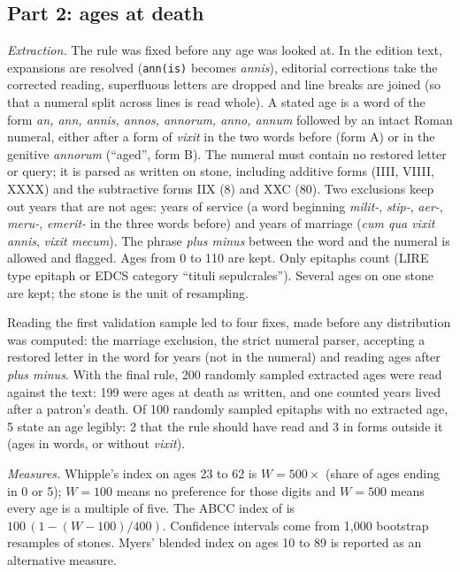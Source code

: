 \documentclass[11pt,a4paper]{article}
\begin{document}
\subsection{Part 2: ages at death}
\textit{Extraction.} The rule was fixed before any age was looked at. In the edition text, expansions are resolved (\texttt{ann(is)} becomes \textit{annis}), editorial corrections take the corrected reading, superfluous letters are dropped and line breaks are joined (so that a numeral split across lines is read whole). A stated age is a word of the form \textit{an, ann, annis, annos, annorum, anno, annum} followed by an intact Roman numeral, either after a form of \textit{vixit} in the two words before (form A) or in the genitive \textit{annorum} (``aged'', form B). The numeral must contain no restored letter or query; it is parsed as written on stone, including additive forms (IIII, VIIII, XXXX) and the subtractive forms IIX (8) and XXC (80). Two exclusions keep out years that are not ages: years of service (a word beginning \textit{milit-}, \textit{stip-}, \textit{aer-}, \textit{meru-}, \textit{emerit-} in the three words before) and years of marriage (\textit{cum qua vixit annis}, \textit{vixit mecum}). The phrase \textit{plus minus} between the word and the numeral is allowed and flagged. Ages from 0 to 110 are kept. Only epitaphs count (LIRE type epitaph or EDCS category ``tituli sepulcrales''). Several ages on one stone are kept; the stone is the unit of resampling.

Reading the first validation sample led to four fixes, made before any distribution was computed: the marriage exclusion, the strict numeral parser, accepting a restored letter in the word for years (not in the numeral) and reading ages after \textit{plus minus}. With the final rule, 200 randomly sampled extracted ages were read against the text: 199 were ages at death as written, and one counted years lived after a patron's death. Of 100 randomly sampled epitaphs with no extracted age, 5 state an age legibly: 2 that the rule should have read and 3 in forms outside it (ages in words, or without \textit{vixit}).

\textit{Measures.} Whipple's index on ages 23 to 62 is $W = 500 \times$ (share of ages ending in 0 or 5); $W = 100$ means no preference for those digits and $W = 500$ means every age is a multiple of five. The ABCC index of \citet{ahearn2009} is $100\,(1 - (W-100)/400)$. Confidence intervals come from 1,000 bootstrap resamples of stones. Myers' blended index \citep{myers1940} on ages 10 to 89 is reported as an alternative measure.
\end{document}
